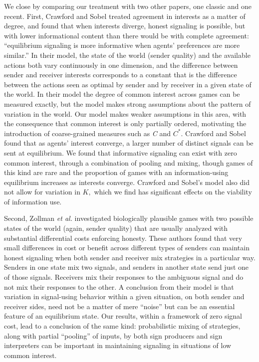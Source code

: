 \documentclass[10pt]{article}
\begin{document}
We close by comparing our treatment with two other papers, one classic
and one recent. First, Crawford and Sobel \cite{Crawford1982} treated agreement in
interests as a matter of degree, and found that when interests diverge,
honest signaling is possible, but with lower informational content than
there would be with complete agreement: ``equilibrium signaling is more
informative when agents' preferences are more similar.'' In their model,
the state of the world (sender quality) and the available actions both
vary continuously in one dimension, and the difference between sender
and receiver interests corresponds to a constant that is the difference
between the actions seen as optimal by sender and by receiver in a given
state of the world. In their model the degree of common interest across
games can be measured exactly, but the model makes strong assumptions
about the pattern of variation in the world. Our model makes weaker
assumptions in this area, with the consequence that common interest is
only partially ordered, motivating the introduction of coarse-grained
measures such as \emph{C} and $C^*$. Crawford and Sobel found that as
agents' interest converge, a larger number of distinct signals can be
sent at equilibrium. We found that informative signaling can exist with
zero common interest, through a combination of pooling and mixing,
though games of this kind are rare and the proportion of games with an
information-using equilibrium increases as interests converge. Crawford
and Sobel's model also did not allow for variation in $K,$ which we find
has significant effects on the viability of information use.

Second, Zollman \emph{et al.} \cite{Zollman2013} investigated biologically plausible games
with two possible states of the world (again, sender quality) that are
usually analyzed with substantial differential costs enforcing honesty.
These authors found that very small differences in cost or benefit
across different types of senders can maintain honest signaling when
both sender and receiver mix strategies in a particular way. Senders in
one state mix two signals, and senders in another state send just one of
those signals. Receivers mix their responses to the ambiguous signal and
do not mix their responses to the other. A conclusion from their model
is that variation in signal-using behavior within a given situation, on
both sender and receiver sides, need not be a matter of mere ``noise''
but can be an essential feature of an equilibrium state. Our results,
within a framework of zero signal cost, lead to a conclusion of the same
kind: probabilistic mixing of strategies, along with partial ``pooling''
of inputs, by both sign producers and sign interpreters can be important
in maintaining signaling in situations of low common interest.
\end{document}

